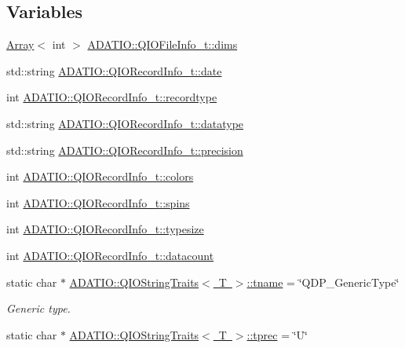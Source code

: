 \subsection*{Variables}
\begin{DoxyCompactItemize}
\item 
\mbox{\hyperlink{classXMLArray_1_1Array}{Array}}$<$ int $>$ \mbox{\hyperlink{group__qio_ga5aa39f1711aa7f6ae4a7b8d73d7e3f97}{A\+D\+A\+T\+I\+O\+::\+Q\+I\+O\+File\+Info\+\_\+t\+::dims}}
\item 
std\+::string \mbox{\hyperlink{group__qio_ga1894a21fc67312581fac55295c8941e6}{A\+D\+A\+T\+I\+O\+::\+Q\+I\+O\+Record\+Info\+\_\+t\+::date}}
\item 
int \mbox{\hyperlink{group__qio_ga88cd070912edbe6d09a2437d3d9c6d08}{A\+D\+A\+T\+I\+O\+::\+Q\+I\+O\+Record\+Info\+\_\+t\+::recordtype}}
\item 
std\+::string \mbox{\hyperlink{group__qio_ga62e8335fcf5ac25dc36eaeee8519ee64}{A\+D\+A\+T\+I\+O\+::\+Q\+I\+O\+Record\+Info\+\_\+t\+::datatype}}
\item 
std\+::string \mbox{\hyperlink{group__qio_gaba8466af5dd242de9e6d63fc5112e6df}{A\+D\+A\+T\+I\+O\+::\+Q\+I\+O\+Record\+Info\+\_\+t\+::precision}}
\item 
int \mbox{\hyperlink{group__qio_gad7bee26b17d771036f2b87c847328b24}{A\+D\+A\+T\+I\+O\+::\+Q\+I\+O\+Record\+Info\+\_\+t\+::colors}}
\item 
int \mbox{\hyperlink{group__qio_ga1a819261ad8c96e3e9378fc74742b1f4}{A\+D\+A\+T\+I\+O\+::\+Q\+I\+O\+Record\+Info\+\_\+t\+::spins}}
\item 
int \mbox{\hyperlink{group__qio_ga415fb0076e8a07dddb97c8c5d6ea08f9}{A\+D\+A\+T\+I\+O\+::\+Q\+I\+O\+Record\+Info\+\_\+t\+::typesize}}
\item 
int \mbox{\hyperlink{group__qio_ga8051a480bb96231cfa758ddfab5ed415}{A\+D\+A\+T\+I\+O\+::\+Q\+I\+O\+Record\+Info\+\_\+t\+::datacount}}
\item 
static char $\ast$ \mbox{\hyperlink{group__qio_ga14189398447447c3ff6d039d05033619}{A\+D\+A\+T\+I\+O\+::\+Q\+I\+O\+String\+Traits$<$ T $>$\+::tname}} = \char`\"{}Q\+D\+P\+\_\+\+Generic\+Type\char`\"{}
\begin{DoxyCompactList}\small\item\em Generic type. \end{DoxyCompactList}\item 
static char $\ast$ \mbox{\hyperlink{group__qio_ga94d948248c229ef3f2935069425f550a}{A\+D\+A\+T\+I\+O\+::\+Q\+I\+O\+String\+Traits$<$ T $>$\+::tprec}} = \char`\"{}U\char`\"{}

\end{DoxyCompactItemize}

